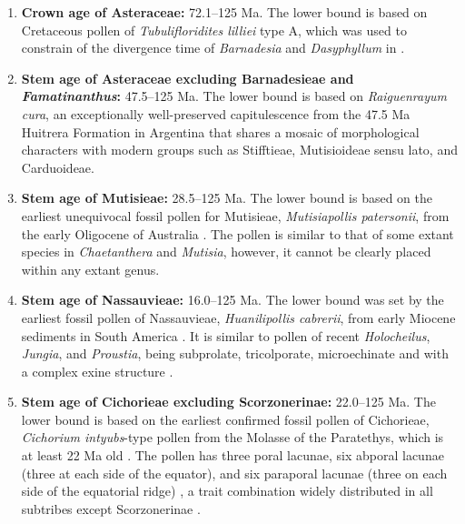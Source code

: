 
\begin{enumerate}

\item \textbf{Crown age of Asteraceae:} 72.1--125 Ma. The lower bound
  is based on Cretaceous pollen of \textit{Tubulifloridites lilliei}
  type A, which was used to constrain of the divergence time of
  \textit{Barnadesia} and \textit{Dasyphyllum} in
  \cite{Barreda2015}.

\item \textbf{Stem age of Asteraceae excluding Barnadesieae and
    \textit{Famatinanthus}:} 47.5--125 Ma. The lower bound is based
  on \textit{Raiguenrayum cura}, an exceptionally well-preserved
  capitulescence from the 47.5 Ma Huitrera Formation in Argentina
  \citep{Barreda2010,Barreda2012} that shares a mosaic of
  morphological characters with modern groups such as Stifftieae,
  Mutisioideae sensu lato, and Carduoideae.

\item \textbf{Stem age of Mutisieae:} 28.5--125 Ma. The lower bound
  is based on the earliest unequivocal fossil pollen for Mutisieae,
  \textit{Mutisiapollis patersonii}, from the early Oligocene of
  Australia \citep{Macphail1994}. The pollen is similar to that of
  some extant species in \textit{Chaetanthera} and \textit{Mutisia},
  however, it cannot be clearly placed within any extant genus.

\item \textbf{Stem age of Nassauvieae:} 16.0--125 Ma. The lower
  bound was set by the earliest fossil pollen of Nassauvieae,
  \textit{Huanilipollis cabrerii}, from early Miocene sediments in
  South America \citep{Barreda2008,Barreda2010}. It is similar to
  pollen of recent \textit{Holocheilus}, \textit{Jungia}, and
  \textit{Proustia}, being subprolate, tricolporate, microechinate and
  with a complex exine structure \citep{Barreda2008}.

\item \textbf{Stem age of Cichorieae excluding Scorzonerinae:}
  22.0--125 Ma. The lower bound is based on the earliest confirmed
  fossil pollen of Cichorieae, \textit{Cichorium intyubs}-type pollen
  from the Molasse of the Paratethys, which is at least 22 Ma old
  \citep{Hochuli1978}. The pollen has three poral lacunae, six abporal
  lacunae (three at each side of the equator), and six paraporal
  lacunae (three on each side of the equatorial ridge)
  \citep{Blackmore1984}, a trait combination widely distributed in all
  subtribes except Scorzonerinae \citep{Tremetsberger2013}.


\end{enumerate}

